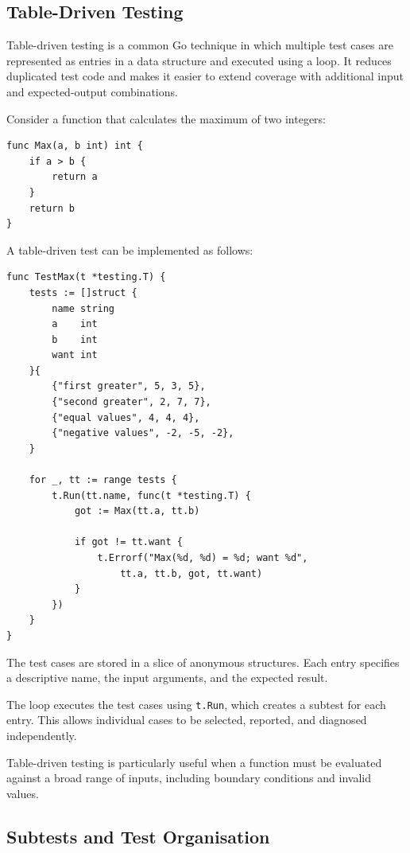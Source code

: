 \subsection{Table-Driven Testing}

Table-driven testing is a common Go technique in which multiple test cases are represented as entries in a data structure and executed using a loop. It reduces duplicated test code and makes it easier to extend coverage with additional input and expected-output combinations.

Consider a function that calculates the maximum of two integers:

\begin{lstlisting}
func Max(a, b int) int {
    if a > b {
        return a
    }
    return b
}
\end{lstlisting}

A table-driven test can be implemented as follows:

\begin{lstlisting}
func TestMax(t *testing.T) {
    tests := []struct {
        name string
        a    int
        b    int
        want int
    }{
        {"first greater", 5, 3, 5},
        {"second greater", 2, 7, 7},
        {"equal values", 4, 4, 4},
        {"negative values", -2, -5, -2},
    }

    for _, tt := range tests {
        t.Run(tt.name, func(t *testing.T) {
            got := Max(tt.a, tt.b)

            if got != tt.want {
                t.Errorf("Max(%d, %d) = %d; want %d",
                    tt.a, tt.b, got, tt.want)
            }
        })
    }
}
\end{lstlisting}

The test cases are stored in a slice of anonymous structures. Each entry specifies a descriptive name, the input arguments, and the expected result.

The loop executes the test cases using \texttt{t.Run}, which creates a subtest for each entry. This allows individual cases to be selected, reported, and diagnosed independently.

Table-driven testing is particularly useful when a function must be evaluated against a broad range of inputs, including boundary conditions and invalid values.

\subsection{Subtests and Test Organisation}

